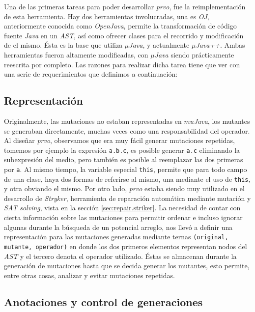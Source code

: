 Una de las primeras tareas para poder desarrollar \emph{prvo}, fue la reimplementaci\'on de esta herramienta. Hay dos herramientas involucradas, una es \emph{OJ}, anteriormente conocida como \emph{OpenJava}, permite la transformaci\'on de c\'odigo fuente \emph{Java} en un \emph{AST}, as\'i como ofrecer clases para el recorrido y modificaci\'on de el mismo. \'Esta es la base que utiliza \emph{$\mu$Java}, y actualmente \emph{$\mu$Java++}. Ambas herramientas fueron altamente modificadas, con \emph{$\mu$Java} siendo pr\'acticamente reescrita por completo. Las razones para realizar dicha tarea tiene que ver con una serie de requerimientos que definimos a continuaci\'on:

\subsection{Representaci\'on}

Originalmente, las mutaciones no estaban representadas en \emph{$mu$Java}, los mutantes se generaban directamente, muchas veces como una responsabilidad del operador. Al dise\~nar \emph{prvo}, observamos que era muy f\'acil generar mutaciones repetidas, tomemos por ejemplo la expresi\'on \lstinline|a.b.c|, es posible generar \lstinline|a.c| eliminando la subexpresi\'on del medio, pero tambi\'en es posible al reemplazar las dos primeras por \lstinline|a|. Al mismo tiempo, la variable especial \lstinline|this|, permite que para todo campo de una clase, haya dos formas de referirse al mismo, una mediante el uso de \lstinline|this|, y otra obviando el mismo. Por otro lado, \emph{prvo} estaba siendo muy utilizado en el desarrollo de \emph{Stryker}, herramienta de reparaci\'on autom\'atica mediante mutaci\'on y \emph{SAT solving}, vista en la secci\'on \ref{sec:repair.striker}. La necesidad de contar con cierta informaci\'on sobre las mutaciones para permitir ordenar e incluso ignorar algunas durante la b\'usqueda de un potencial arreglo, nos llev\'o a definir una representaci\'on para las mutaciones generadas mediante ternas \texttt{(original, mutante, operador)} en donde los dos primeros elementos representan nodos del \emph{AST} y el tercero denota el operador utilizado. \'Estas se almacenan durante la generaci\'on de mutaciones hasta que se decida generar los mutantes, esto permite, entre otras cosas, analizar y evitar mutaciones repetidas.

\subsection{Anotaciones y control de generaciones}

